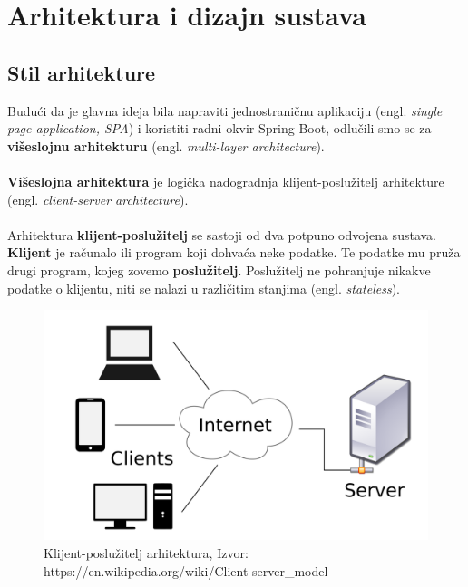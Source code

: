 \chapter{Arhitektura i dizajn sustava}

\section{Stil arhitekture}

	Budući da je glavna ideja bila napraviti jednostraničnu aplikaciju (engl. \textit{single page application, SPA}) i koristiti radni okvir Spring Boot,  odlučili smo se za \textbf{višeslojnu arhitekturu} (engl. \textit{multi-layer architecture}).\\\\
	\textbf{Višeslojna arhitektura} je logička nadogradnja klijent-poslužitelj arhitekture (engl. \textit{client-server architecture}).\\\\
	Arhitektura \textbf{klijent-poslužitelj} se sastoji od dva potpuno odvojena sustava.\\
	\textbf{Klijent} je računalo ili program koji dohvaća neke podatke. Te podatke mu pruža drugi program, kojeg zovemo \textbf{poslužitelj}. Poslužitelj ne pohranjuje nikakve podatke o klijentu, niti se nalazi u različitim stanjima (engl. \textit{stateless}).
	
	\begin{figure}[H]
		\centering
		\includegraphics[width=\linewidth]{slike/client-server.png}
		\caption {Klijent-poslužitelj arhitektura,  Izvor: https://en.wikipedia.org/wiki/Client-server\_model}
		\label{fig:client-server}
	\end{figure}


